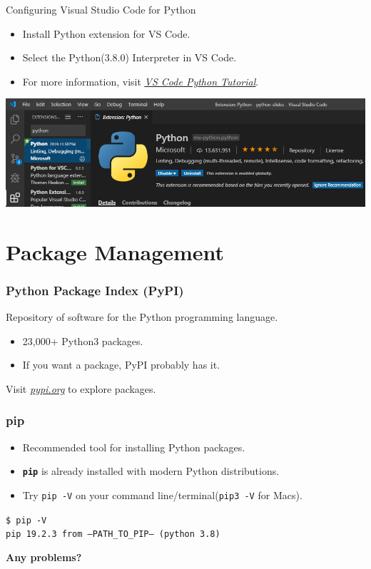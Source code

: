      \begin{frame}{Configuring Visual Studio Code for Python}
        \LARGE
        \begin{itemize}
            \item Install Python extension for VS Code.
            \pause
            \item Select the Python(3.8.0) Interpreter in VS Code.
            \pause
            \item For more information, visit \href{https://code.visualstudio.com/docs/python/python-tutorial}{\underline{\textit{VS Code Python Tutorial}}}.
        \end{itemize}
        \centering
        \includegraphics[width=0.75\linewidth]{images/python_extension.PNG}						
     \end{frame}

    \section{Package Management}

    \begin{frame}
        \frametitle{Python Package Index (PyPI)}
        \pause
        \huge
        Repository of software for the Python programming language.
        \pause
        \begin{itemize}
            \item 23,000+ Python3 packages.
            \pause
            \item If you want a package, PyPI probably has it. 
        \end{itemize}
        \pause
        Visit \href{https://pypi.org/}{\underline{\textit{pypi.org}}} to explore packages.
    \end{frame}

    \begin{frame}
        \frametitle{pip}
        \LARGE
        \pause
        \begin{itemize}
        \item Recommended tool for installing Python packages.
        \pause
        \item \textbf{\texttt{pip}} is already installed with modern Python distributions.
        \pause
        \item Try \texttt{pip -V} on your command line/terminal(\texttt{pip3 -V} for Macs). 
        \end{itemize}
        \pause
        \texttt{\$ pip -V}\\
        \texttt{pip 19.2.3 from --PATH\_TO\_PIP-- (python 3.8)}\\
        \pause
        \begin{center}
            \huge
            \textbf{Any problems?}            
        \end{center}
        
    \end{frame}

